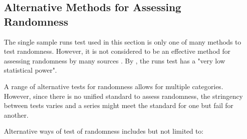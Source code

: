 \documentclass[12pt]{article}
\theoremstyle{plain}
\theoremstyle{definition}
\theoremstyle{remark}
\begin{document}
\subsection{Alternative Methods for Assessing Randomness}
The single sample runs test used in this section is only one of many methods to test randomness. However, it is not considered to be an effective method for assessing randomness by many sources \cite{3.4}. By \cite{3.8}, the runs test has a "very low statistical power".

A range of alternative tests for randomness allows for multiple categories. However, since there is no unified standard to assess randomness, the stringency between tests varies and a series might meet the standard for one but fail for another. \cite{3.4}

Alternative ways of test of randomness includes but not limited to: 
\end{document}
